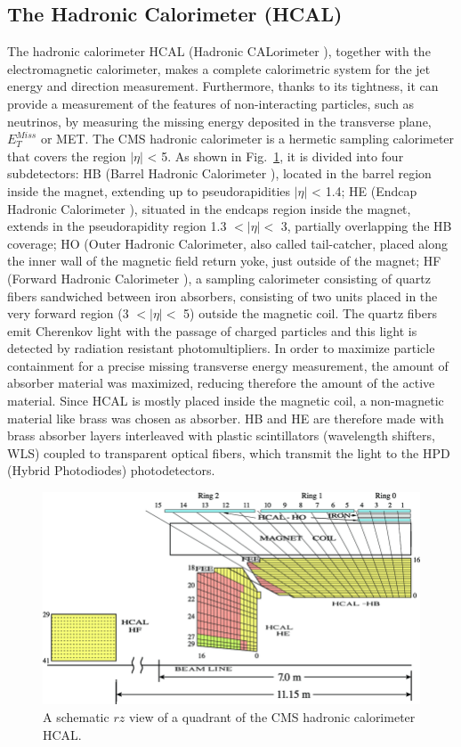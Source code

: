 \subsection*{The Hadronic Calorimeter (HCAL)}
The hadronic calorimeter HCAL (Hadronic CALorimeter ), together with the electromagnetic calorimeter, 
makes a complete calorimetric system for the jet energy and
direction measurement. Furthermore, thanks to its tightness, it can provide a measurement 
of the features of non-interacting particles, such as neutrinos, by measuring the
missing energy deposited in the transverse plane, $E_T^{Miss}$ or MET. The CMS hadronic calorimeter is
a hermetic sampling calorimeter that covers the region $|\eta|$ < 5. As shown in Fig.~\ref{hcal},
it is divided into four subdetectors: HB (Barrel Hadronic Calorimeter ), located in the
barrel region inside the magnet, extending up to pseudorapidities  $|\eta|$ < 1.4; HE (Endcap
Hadronic Calorimeter ), situated in the endcaps region inside the magnet, extends in the
pseudorapidity region 1.3   $<|\eta|<$  3, partially overlapping the HB coverage; HO (Outer
Hadronic Calorimeter, also called tail-catcher, placed along the inner wall of the magnetic 
field return yoke, just outside of the magnet; HF (Forward Hadronic Calorimeter ),
a sampling calorimeter consisting of quartz fibers sandwiched between iron absorbers,
consisting of two units placed in the very forward region (3  $<|\eta|<$ 5) outside the magnetic coil. 
The quartz fibers emit Cherenkov light with the passage of charged particles
and this light is detected by radiation resistant photomultipliers.
In order to maximize particle containment for a precise missing transverse energy
measurement, the amount of absorber material was maximized, reducing therefore the
amount of the active material. Since HCAL is mostly placed inside the magnetic coil,
a non-magnetic material like brass was chosen as absorber. HB and HE are therefore
made with brass absorber layers interleaved with plastic scintillators (wavelength shifters,
WLS) coupled to transparent optical fibers, which transmit the light to the HPD (Hybrid
Photodiodes) photodetectors.
\begin{figure}
\centering
\includegraphics[scale= 0.4]{../Cap2/hcal}
\caption{A schematic $rz$ view of a quadrant of the CMS hadronic calorimeter HCAL.}
\label{hcal}
\end{figure}


